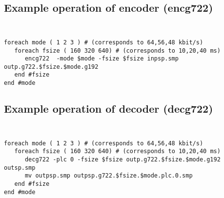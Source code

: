 \subsection {Example operation of encoder (encg722)}
{\tt\small
\begin{verbatim}
foreach mode ( 1 2 3 ) # (corresponds to 64,56,48 kbit/s)
   foreach fsize ( 160 320 640) # (corresponds to 10,20,40 ms) 
      encg722  -mode $mode -fsize $fsize inpsp.smp outp.g722.$fsize.$mode.g192 
   end #fsize 
end #mode
\end{verbatim}
}

\subsection {Example operation of decoder (decg722)}
{\tt\small
\begin{verbatim}
foreach mode ( 1 2 3 ) # (corresponds to 64,56,48 kbit/s)
   foreach fsize ( 160 320 640) # (corresponds to 10,20,40 ms) 
      decg722 -plc 0 -fsize $fsize outp.g722.$fsize.$mode.g192  outsp.smp
      mv outpsp.smp outpsp.g722.$fsize.$mode.plc.0.smp 
   end #fsize
end #mode
\end{verbatim}
}
